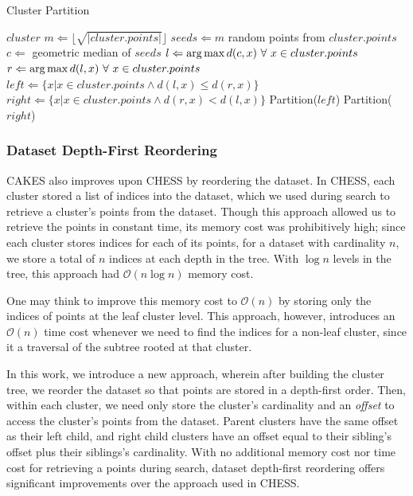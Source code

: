 \begin{algorithm} %
\caption{Cluster Partition} %
\label{alg:partition} %
\begin{algorithmic}[1] %
    \REQUIRE $cluster$
    \STATE $m \Leftarrow \lfloor \sqrt{|cluster.points|} \rfloor$
    \STATE $seeds \Leftarrow m$ random points from $cluster.points$
    \STATE $c \Leftarrow$ geometric median of $seeds$
    \STATE $l \Leftarrow \operatorname*{arg\,max} d(c,x) \ \forall \ x \in cluster.points$
    \STATE $r \Leftarrow \operatorname*{arg\,max} d(l,x) \ \forall \ x \in cluster.points$
    \STATE $left \Leftarrow \{x | x \in cluster.points \land d(l,x) \le d(r,x)\}$
    \STATE $right \Leftarrow \{x | x \in cluster.points \land d(r,x) < d(l,x)\}$
        \STATE Partition($left$)
    \ENDIF
        \STATE Partition($right$)
    \ENDIF
\end{algorithmic}
\end{algorithm}

\subsubsection {Dataset Depth-First Reordering}
\label{subsubsec:methods:dataset-depth-first-reordering}

CAKES also improves upon CHESS by reordering the dataset. In CHESS, each cluster stored a list of indices into the dataset, 
which we used during search to retrieve a cluster's points from the dataset. 
Though this approach allowed us to retrieve the points in constant 
time, its memory cost was prohibitively high; since each cluster stores indices for each of its
points, for a dataset with cardinality $n$, we store a total of $n$ indices at each depth in the tree.
With $\log{}n$ levels in the tree, this approach had $\mathcal{O}(n\log{}n)$ memory cost. 


One may think to improve this memory cost to $\mathcal{O}(n)$ by storing only the indices of points at 
the leaf cluster level.
This approach, however, introduces an $\mathcal{O}(n)$ time cost whenever we need to find the indices for 
a non-leaf cluster, since it a traversal of the subtree rooted at that cluster.


In this work, we introduce a new approach, wherein after building the cluster tree, we reorder the dataset 
so that points are stored in a depth-first order. Then, within each cluster, we need only 
store the cluster's cardinality and an \emph{offset} to access the cluster's points from the dataset. Parent clusters 
have the same offset as their left child, and right child clusters have an offset equal to their sibling's offset
plus their siblings's cardinality. With no additional memory cost nor time cost for retrieving a points during search, 
dataset depth-first reordering offers significant improvements over the approach used in CHESS.


